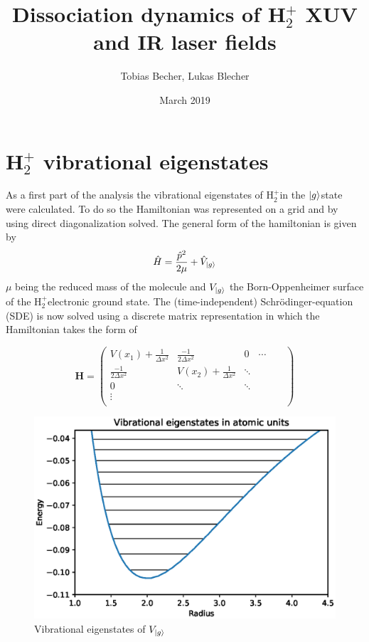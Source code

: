 \documentclass[12pt]{article}
\title{Dissociation dynamics of H$_2^+$ XUV and IR laser fields}
\author{Tobias Becher, Lukas Blecher}
\date{March 2019}
\newcommand{\hp}{H$_2^+$}
\newcommand{\gr}{$\ket{g}$}
\begin{document}
\maketitle
\begin{abstract}
    
\end{abstract}



\section{H$_2^+$ vibrational eigenstates}
As a first part of the analysis the vibrational eigenstates of \hp in the 
\gr state were calculated. To do so the Hamiltonian was represented on a grid and by using direct diagonalization solved.
The general form of the hamiltonian is given by 
\begin{equation}\label{eqn:generalHamiltonian}
    \hat{H}=\frac{\hat{p}^2}{2\mu}+\hat{V}_{\ket{g}}
\end{equation}
$\mu$ being the reduced mass of the molecule and $V_{\ket{g}}$ the Born-Oppenheimer surface of the \hp electronic ground state.
The (time-independent) Schr\"odinger-equation (SDE) is now solved using a discrete matrix representation in which the Hamiltonian takes the form of

\begin{equation}\label{eqn:discresteHamiltonian}
    \mathbf H=\left({\begin{array}{cccccc}
   V(x_1)+\frac{1}{\Delta x^2} & \frac{-1}{2\Delta x^2} &0& \cdots & &\\
   \frac{-1}{2\Delta x^2} & V(x_2)+\frac{1}{\Delta x^2} & \ddots & & & \\
   0 &\ddots  &\ddots &&&\\
   \vdots&&&&&\\
  \end{array} } \right)
\end{equation}
\begin{figure}
    \centering
    \includegraphics[width=1\textwidth]{vibEigenstates.eps}
    \caption{Vibrational eigenstates of $V_{\ket{g}}$ }
    \label{fig:vib}
\end{figure}


\end{document}
